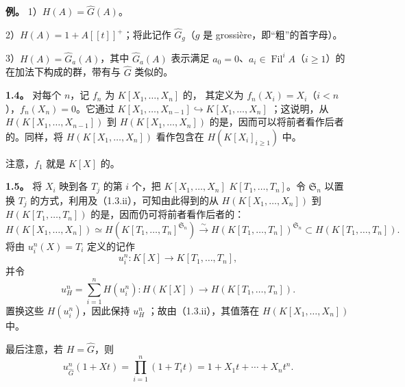 \textbf{例。} 1）$H(A)=\widehat G(A)$。

2）$H(A)=1+A[[t]]^+$；将此记作 $\widehat G_g$（$g$ 是 grossière，即“粗”的首字母）。

3）$H(A)=\widehat G_a(A)$，其中 $\widehat G_a(A)$ 表示满足 $a_0=0$、$a_i\in\operatorname{Fil}^iA$（$i\geqslant1$）的在加法下构成的群，带有与 $\widehat G$ 类似的。

\textbf{1.4。} 对每个 $n$，记 $f_n$ 为 $K[X_1,\ldots,X_n]$ 的，
其定义为 $f_n(X_i)=X_i$（$i<n$），$f_n(X_n)=0$。它通过 $K[X_1,\ldots,X_{n-1}]\hookrightarrow K[X_1,\ldots,X_n]$ ；这说明，从 $H(K[X_1,\ldots,X_{n-1}])$ 到 $H(K[X_1,\ldots,X_n])$ 的是，因而可以将前者看作后者的。同样，将 $H(K[X_1,\ldots,X_n])$ 看作包含在 $H(K[X_i]_{i\geqslant1})$ 中。

注意，$f_1$ 就是 $K[X]$ 的。

\textbf{1.5。} 将 $X_i$ 映到各 $T_j$ 的第 $i$ 个，把 $K[X_1,\ldots,X_n]$  $K[T_1,\ldots,T_n]$。令 $\mathfrak S_n$ 以置换 $T_j$ 的方式，利用及（1.3.ii），可知由此得到的从 $H(K[X_1,\ldots,X_n])$ 到 $H(K[T_1,\ldots,T_n])$ 的是，因而仍可将前者看作后者的：
\[
H(K[X_1,\ldots,X_n])\simeq
H(K[T_1,\ldots,T_n]^{\mathfrak S_n})
\xrightarrow{\sim}H(K[T_1,\ldots,T_n])^{\mathfrak S_n}
\subset H(K[T_1,\ldots,T_n]).
\]
将由 $u_i^n(X)=T_i$ 定义的记作
\[
u_i^n:K[X]\longrightarrow K[T_1,\ldots,T_n],
\]
并令
\[
u_H^n=\sum_{i=1}^nH(u_i^n):H(K[X])\longrightarrow H(K[T_1,\ldots,T_n]).
\]
置换这些 $H(u_i^n)$，因此保持 $u_H^n$ ；故由（1.3.ii），其值落在
$H(K[X_1,\ldots,X_n])$ 中。

最后注意，若 $H=\widehat G$，则
\[
u_{\widehat G}^n(1+Xt)=\prod_{i=1}^n(1+T_it)=1+X_1t+\cdots+X_nt^n.
\]


